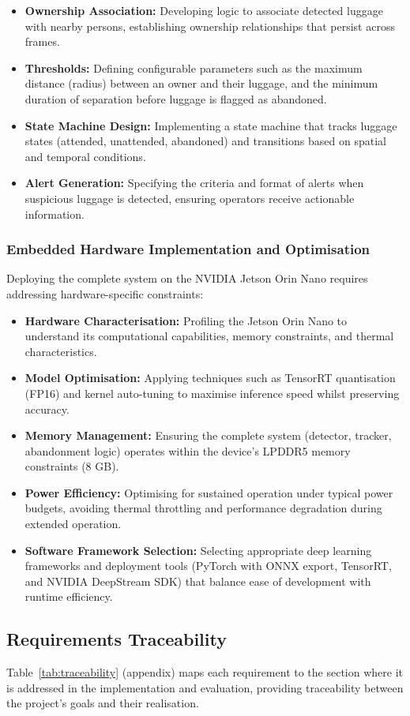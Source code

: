 \begin{itemize}
	\item \textbf{Ownership Association:}\label{req:ownership} Developing logic to associate detected
	      luggage with nearby persons, establishing ownership relationships that
	      persist across frames.
	\item \textbf{Thresholds:}\label{req:thresholds} Defining configurable parameters such as
	      the maximum distance (radius) between an owner and their luggage, and
	      the minimum duration of separation before luggage is flagged as
	      abandoned.
	\item \textbf{State Machine Design:}\label{req:state_machine} Implementing a state machine that
	      tracks luggage states (attended, unattended, abandoned) and transitions
	      based on spatial and temporal conditions.
	\item \textbf{Alert Generation:}\label{req:alert_gen} Specifying the criteria and format of
	      alerts when suspicious luggage is detected, ensuring operators receive
	      actionable information.
\end{itemize}

\subsubsection{Embedded Hardware Implementation and Optimisation}

Deploying the complete system on the NVIDIA Jetson Orin Nano requires
addressing hardware-specific constraints:

\begin{itemize}
	\item \textbf{Hardware Characterisation:}\label{req:hw_char} Profiling the Jetson Orin Nano to
	      understand its computational capabilities, memory constraints, and
	      thermal characteristics.
	\item \textbf{Model Optimisation:}\label{req:model_opt} Applying techniques such as TensorRT
	      quantisation (FP16) and kernel auto-tuning to maximise inference speed
	      whilst preserving accuracy.
	\item \textbf{Memory Management:}\label{req:memory} Ensuring the complete system (detector,
	      tracker, abandonment logic) operates within the device's LPDDR5 memory
	      constraints (8 GB).
	\item \textbf{Power Efficiency:}\label{req:power} Optimising for sustained operation under
	      typical power budgets, avoiding thermal throttling and performance
	      degradation during extended operation.
	\item \textbf{Software Framework Selection:}\label{req:framework} Selecting appropriate deep
	      learning frameworks and deployment tools (PyTorch with ONNX export,
	      TensorRT, and NVIDIA DeepStream SDK) that balance ease of development
	      with runtime efficiency.
\end{itemize}

\subsection{Requirements Traceability}
\label{sec:requirements_traceability}

Table~\ref{tab:traceability} (appendix) maps each requirement to the section where it is
addressed in the implementation and evaluation, providing traceability between
the project's goals and their realisation.

